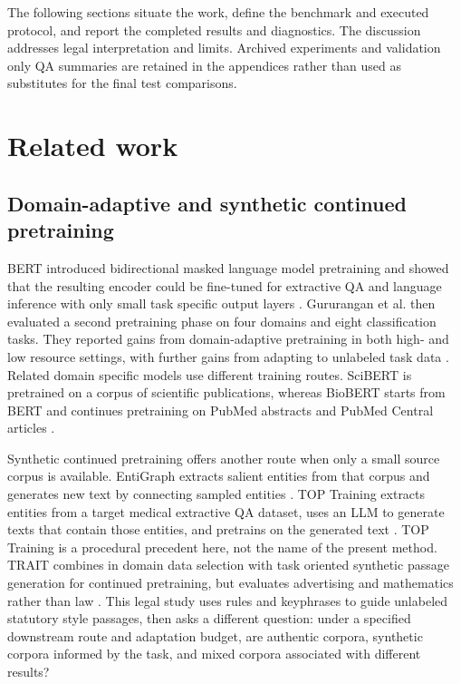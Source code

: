 \documentclass[pdflatex,sn-basic]{sn-jnl}
\begin{document}
The following sections situate the work, define the benchmark and executed
protocol, and report the completed results and diagnostics. The discussion
addresses legal interpretation and limits. Archived experiments and
validation only QA summaries are retained in the appendices rather than used
as substitutes for the final test comparisons.


\section{Related work}\label{sec:related}

\subsection{Domain-adaptive and synthetic continued pretraining}

BERT introduced bidirectional masked language model pretraining and showed that
the resulting encoder could be fine-tuned for extractive QA and language
inference with only small task specific output layers
\citep{devlinBERTPretrainingDeep2019}. Gururangan et al. then evaluated a second
pretraining phase on four domains and eight classification tasks. They reported
gains from domain-adaptive pretraining in both high- and low resource settings,
with further gains from adapting to unlabeled task data
\citep{gururanganDontStopPretraining2020}. Related domain specific models use
different training routes. SciBERT is pretrained on a corpus of scientific
publications, whereas BioBERT starts from BERT and continues pretraining on
PubMed abstracts and PubMed Central articles
\citep{beltagySciBERTPretrainedLanguage2019,leeBioBERTPretrainedBiomedical2020}.

Synthetic continued pretraining offers another route when only a small source
corpus is available. EntiGraph extracts salient entities from that corpus and
generates new text by connecting sampled entities
\citep{yangSyntheticContinuedPretraining2025}. TOP Training extracts entities
from a target medical extractive QA dataset, uses an LLM to generate texts that
contain those entities, and pretrains on the generated text
\citep{senguptaTOPTrainingTargetOrientedPretraining2025}. TOP Training is a
procedural precedent here, not the name of the present method. TRAIT combines
in domain data selection with task oriented synthetic passage generation for
continued pretraining, but evaluates advertising and mathematics rather than
law \citep{liangTaskOrientedInDomain2024}. This legal study uses rules and
keyphrases to guide unlabeled statutory style passages, then asks a different
question: under a specified downstream route and adaptation budget, are
authentic corpora, synthetic corpora informed by the task, and mixed corpora associated with
different results?
\end{document}
